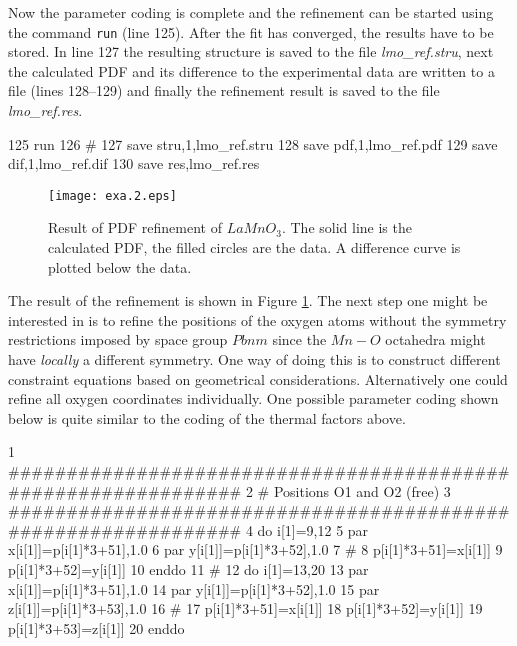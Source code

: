 \noindent Now the parameter coding is complete and the refinement
can be started using the command {\tt run} (line 125). After the
fit has converged, the results have to be stored. In line 127 the
resulting structure is saved to the file {\it lmo\_ref.stru}, next
the calculated PDF and its difference to the experimental data are
written to a file (lines 128--129) and finally the refinement
result is saved to the file {\it lmo\_ref.res}.

\footnotesize
\begin{MacVerbatim}
    125 run
    126 #
    127 save stru,1,lmo_ref.stru
    128 save pdf,1,lmo_ref.pdf
    129 save dif,1,lmo_ref.dif
    130 save res,lmo_ref.res
\end{MacVerbatim}
\normalsize

\begin{figure}[!bt]
   \centering
   \texttt{[image: exa.2.eps]}
   \caption[Result of PDF refinement of $LaMnO_{3}$]
           {Result of PDF refinement of $LaMnO_{3}$. The solid line is the
            calculated PDF, the filled circles are the data. A difference
            curve is plotted below the data.}
   \label{exa_fig2}
\end{figure}

\noindent The result of the refinement is shown in Figure
\ref{exa_fig2}. The next step one might be interested in is to
refine the positions of the oxygen atoms without the symmetry
restrictions imposed by space group $Pbnm$ since the $Mn-O$
octahedra might have {\it locally} a different symmetry. One way
of doing this is to construct different constraint equations based
on geometrical considerations. Alternatively one could refine all
oxygen coordinates individually. One possible parameter coding
shown below is quite similar to the coding of the thermal factors
above.

\footnotesize
\begin{MacVerbatim}
      1 ###############################################################
      2 # Positions O1 and O2 (free)
      3 ###############################################################
      4 do i[1]=9,12
      5   par x[i[1]]=p[i[1]*3+51],1.0
      6   par y[i[1]]=p[i[1]*3+52],1.0
      7 #
      8   p[i[1]*3+51]=x[i[1]]
      9   p[i[1]*3+52]=y[i[1]]
     10 enddo
     11 #
     12 do i[1]=13,20
     13   par x[i[1]]=p[i[1]*3+51],1.0
     14   par y[i[1]]=p[i[1]*3+52],1.0
     15   par z[i[1]]=p[i[1]*3+53],1.0
     16 #
     17   p[i[1]*3+51]=x[i[1]]
     18   p[i[1]*3+52]=y[i[1]]
     19   p[i[1]*3+53]=z[i[1]]
     20 enddo
\end{MacVerbatim}
\normalsize

